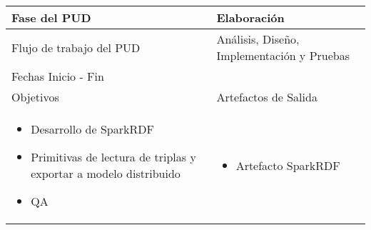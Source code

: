 \vspace{1cm}
\begin{tabular}{|p{}|p{}|}

\hline

\cellcolor[gray]{0.7}Fase del \acs{PUD} & Elaboración
 \\
\hline

\cellcolor[gray]{0.7}Flujo de trabajo del \acs{PUD} & Análisis, Diseño,
Implementación y Pruebas
 \\
\hline

\cellcolor[gray]{0.7}Fechas Inicio - Fin  &
 \\
\hline

\cellcolor[gray]{0.7}Objetivos  &
\cellcolor[gray]{0.7}Artefactos de Salida \\
\hline

\begin{itemize}
\item Desarrollo de SparkRDF
\item Primitivas de lectura de triplas y exportar a modelo distribuido
\item QA
\end{itemize}

&

\begin{itemize}
\item Artefacto SparkRDF 
\end{itemize}
\\
\hline
\end{tabular}


